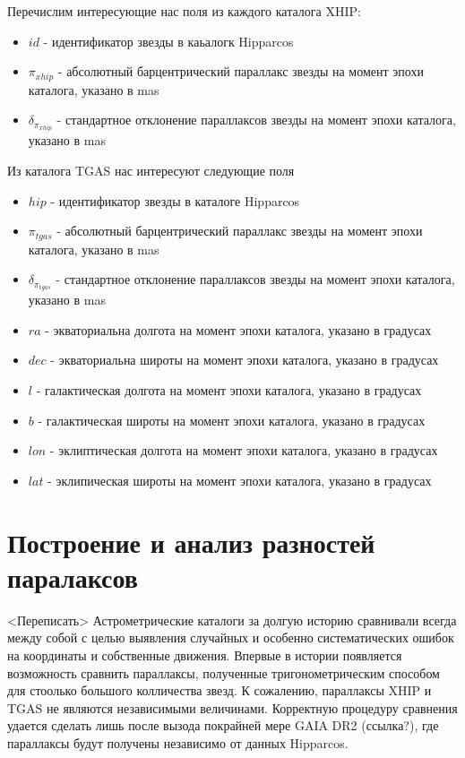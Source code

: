 \documentclass[14pt]{article} %
\begin{document}
Перечислим интересующие нас поля из каждого каталога XHIP:

\begin{itemize}

\item $id$ - идентификатор звезды в каьалогк Hipparcos

\item $\pi_{xhip}$ - абсолютный барцентрический параллакс звезды на момент эпохи каталога, указано в mas

\item $\delta_{\pi_{xhip}}$ - стандартное отклонение параллаксов звезды на момент эпохи каталога, указано в mas

\end{itemize}

Из каталога TGAS нас интересуют следующие поля

\begin{itemize}

\item $hip$ - идентификатор звезды в каталоге Hipparcos

\item $\pi_{tgas}$ - абсолютный барцентрический параллакс звезды на момент эпохи каталога, указано в mas

\item $\delta_{\pi_{tgas}}$ - стандартное отклонение параллаксов звезды на момент эпохи каталога, указано в mas

\item $ra$ - экваториальна долгота на момент эпохи каталога, указано в градусах

\item $dec$ - экваториальна широты на момент эпохи каталога, указано в градусах

\item $l$ - галактическая долгота на момент эпохи каталога, указано в градусах

\item $b$ - галактическая широты на момент эпохи каталога, указано в градусах

\item $lon$ - эклиптическая долгота на момент эпохи каталога, указано в градусах

\item $lat$ - эклипическая широты на момент эпохи каталога, указано в градусах

\end{itemize}

\section{Построение и анализ разностей паралаксов}\label{errvid}
<Переписать>
Астрометрические каталоги за долгую историю сравнивали  всегда между собой с целью выявления случайных и особенно систематических ошибок на координаты и собственные движения. Впервые в истории появляется возможность сравнить параллаксы, полученные тригонометрическим способом для стоолько большого колличества звезд. К сожалению, параллаксы XHIP и TGAS  не являются независимыми величинами. Корректную процедуру сравнения удается сделать лишь после вызода покрайней мере GAIA DR2 (ссылка?), где параллаксы будут получены независимо от данных Hipparcos.
\end{document}

